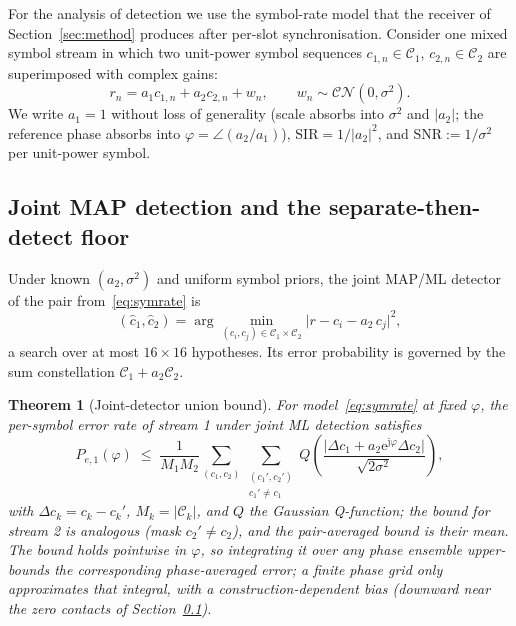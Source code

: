 \documentclass[journal]{IEEEtran}
\newcommand{\snr}{\mathrm{SNR}}
\newcommand{\sir}{\mathrm{SIR}}
\newcommand{\ee}{\mathrm{e}}
\newcommand{\jj}{\mathrm{j}}
\newcommand{\const}{\mathcal{C}}
\newcommand{\VQ}{Q}
\newtheorem{theorem}{Theorem}
\begin{document}
For the analysis of detection we use the symbol-rate model that the
receiver of Section~\ref{sec:method} produces after per-slot
synchronisation. Consider one mixed symbol stream in which two
unit-power symbol sequences $c_{1,n} \in \const_1$,
$c_{2,n} \in \const_2$ are superimposed with complex gains:
\begin{equation}
  r_n = a_1 c_{1,n} + a_2 c_{2,n} + w_n, \qquad
  w_n \sim \mathcal{CN}(0, \sigma^2).
  \label{eq:symrate}
\end{equation}
We write $a_1 = 1$ without loss of generality (scale absorbs into
$\sigma^2$ and $|a_2|$; the reference phase absorbs into
$\varphi = \angle(a_2 / a_1)$), $\sir = 1/|a_2|^2$, and
$\snr := 1/\sigma^2$ per unit-power symbol.

\subsection{Joint MAP detection and the separate-then-detect floor}
\label{sec:theory-joint}

Under known $(a_2, \sigma^2)$ and uniform symbol priors, the joint
MAP/ML detector of the pair from~\eqref{eq:symrate} is
\begin{equation}
  (\hat{c}_1, \hat{c}_2)
  = \arg\min_{(c_i, c_j) \in \const_1 \times \const_2}
    \big| r - c_i - a_2\, c_j \big|^2 ,
  \label{eq:jmap}
\end{equation}
a search over at most $16 \times 16$ hypotheses. Its error probability
is governed by the sum constellation
$\const_1 + a_2 \const_2$.

\begin{theorem}[Joint-detector union bound]
\label{thm:ub}
For model~\eqref{eq:symrate} at fixed $\varphi$, the per-symbol error
rate of stream 1 under joint ML detection satisfies
\begin{equation}
  P_{e,1}(\varphi) \;\leq\;
  \frac{1}{M_1 M_2}
  \sum_{(c_1, c_2)} \sum_{\substack{(c_1', c_2') \\ c_1' \neq c_1}}
  \VQ\!\left(
    \frac{\big| \Delta c_1 + a_2 \ee^{\jj\varphi} \Delta c_2 \big|}
         {\sqrt{2\sigma^2}}
  \right),
  \label{eq:ub}
\end{equation}
with $\Delta c_k = c_k - c_k'$, $M_k = |\const_k|$, and $\VQ$ the
Gaussian Q-function; the bound for stream 2 is analogous (mask
$c_2' \neq c_2$), and the pair-averaged bound is their mean. The bound
holds pointwise in $\varphi$, so integrating it over any phase
ensemble upper-bounds the corresponding phase-averaged error; a finite
phase grid only \emph{approximates} that integral, with a
construction-dependent bias (downward near the zero contacts of
Section~\ref{sec:theory-joint}).
\end{theorem}
\end{document}
